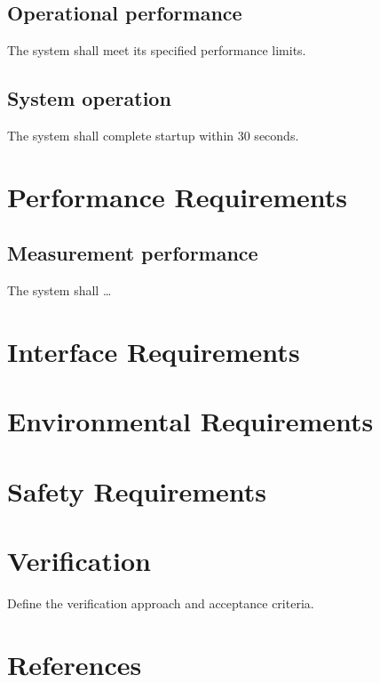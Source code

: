 \documentclass[11pt]{article}
\begin{document}
\subsection{Operational performance}
\label{sec:orga8c91b1}
The system shall meet its specified performance limits.
\subsection{System operation}
\label{sec:org3d264f3}
The system shall complete startup within 30 seconds.
\section{Performance Requirements}
\label{sec:orge54745d}

\subsection{Measurement performance}
\label{sec:orga77818e}
The system shall \ldots{}
\section{Interface Requirements}
\label{sec:orgf48e9fe}

\section{Environmental Requirements}
\label{sec:orgb49f806}

\section{Safety Requirements}
\label{sec:org7b4c273}

\section{Verification}
\label{sec:org26a87d7}

Define the verification approach and acceptance criteria.
\section{References}
\label{sec:org98172cd}
\end{document}
